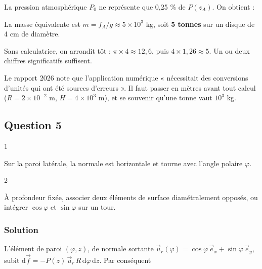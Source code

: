 \documentclass[11pt,a4paper]{article}
\newcommand{\equationajustee}[1]{%
  \sbox{\boiteequation}{$\displaystyle #1$}%
  \ifdim\wd\boiteequation>\linewidth
    \[\resizebox{\linewidth}{!}{\usebox{\boiteequation}}\]%
  \else
    \[#1\]%
  \fi}
\begin{document}
La pression atmosphérique \(P_0\) ne représente que 0,25 \% de \(P(z_A)\). On obtient :

\equationajustee{\boxed{f_A = P(z_A)\,S \approx 5 \times 10^4\ \mathrm{N}}}

La masse équivalente est \(m = f_A/g \approx 5 \times 10^3\) kg, soit \textbf{5 tonnes} sur un disque de 4 cm de diamètre.

\begin{methode}

Sans calculatrice, on arrondit tôt : \(\pi \times 4 \approx 12{,}6\), puis \(4 \times 1{,}26 \approx 5\). Un ou deux chiffres significatifs suffisent.

\end{methode}

\begin{piege}

Le rapport 2026 note que l'application numérique « nécessitait des conversions d'unités qui ont été sources d'erreurs ». Il faut passer en mètres avant tout calcul (\(R = 2 \times 10^{-2}\) m, \(H = 4 \times 10^3\) m), et se souvenir qu'une tonne vaut \(10^3\) kg.

\end{piege}

\hypertarget{question-5}{%
\subsection{Question 5}\label{question-5}}

\begin{indication}{1}

Sur la paroi latérale, la normale est horizontale et tourne avec l'angle polaire \(\varphi\).

\end{indication}

\begin{indication}{2}

À profondeur fixée, associer deux éléments de surface diamétralement opposés, ou intégrer \(\cos\varphi\) et \(\sin\varphi\) sur un tour.

\end{indication}

\hypertarget{solution-4}{%
\subsubsection{Solution}\label{solution-4}}

L'élément de paroi \((\varphi, z)\), de normale sortante \(\vec u_r(\varphi) = \cos\varphi\,\vec e_x + \sin\varphi\,\vec e_y\), subit \(\mathrm{d}\vec f = -P(z)\,\vec u_r\,R\,\mathrm{d}\varphi\,\mathrm{d}z\). Par conséquent
\end{document}
